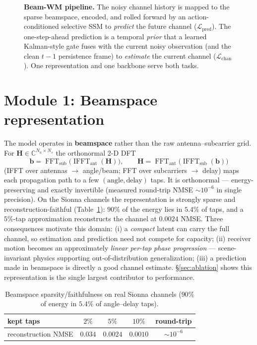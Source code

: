 \documentclass[11pt]{article}
\newcommand{\C}{\mathbb{C}}
\newcommand{\Hc}{\mathbf{H}}
\newcommand{\bs}{\mathbf{b}}
\DeclareMathOperator{\FFT}{FFT}
\DeclareMathOperator{\IFFT}{IFFT}
\begin{document}
\begin{figure}[t]
\caption{\textbf{Beam-WM pipeline.} The noisy channel history is mapped to the sparse beamspace, encoded,
and rolled forward by an action-conditioned selective SSM to \emph{predict} the future channel
($\mathcal L_{\text{pred}}$). The one-step-ahead prediction is a temporal \emph{prior} that a learned
Kalman-style gate fuses with the current noisy observation (and the clean $t{-}1$ persistence frame) to
\emph{estimate} the current channel ($\mathcal L_{\text{chan}}$). One representation and one backbone
serve both tasks.}
\label{fig:arch}
\end{figure}

\section{Module 1: Beamspace representation}\label{sec:beamspace}

The model operates in \textbf{beamspace} rather than the raw antenna--subcarrier grid. For
$\Hc\in\C^{N_a\times N_s}$ the orthonormal 2-D DFT
\begin{equation}
\bs = \FFT_{\text{sub}}\!\big(\IFFT_{\text{ant}}(\Hc)\big),\qquad
\Hc = \FFT_{\text{ant}}\!\big(\IFFT_{\text{sub}}(\bs)\big)
\end{equation}
(IFFT over antennas $\to$ angle/beam; FFT over subcarriers $\to$ delay) maps each propagation path to
a few $(\text{angle},\text{delay})$ taps. It is orthonormal --- energy-preserving and exactly
invertible (measured round-trip NMSE $\sim\!10^{-6}$ in single precision). On the Sionna channels the
representation is strongly sparse and reconstruction-faithful (Table~\ref{tab:beam}): $90\%$ of the
energy lies in $5.4\%$ of taps, and a $5\%$-tap approximation reconstructs the channel at $0.0024$
NMSE. Three consequences motivate this domain: (i) a \emph{compact} latent can carry the full channel,
so estimation and prediction need not compete for capacity; (ii) receiver motion becomes an
approximately \emph{linear per-tap phase progression} --- scene-invariant physics supporting
out-of-distribution generalization; (iii) a prediction made in beamspace is directly a good channel
estimate. \S\ref{sec:ablation} shows this representation is the single largest contributor to
performance.

\begin{table}[h]
\centering
\begin{tabular}{lcccc}
\toprule
kept taps & $2\%$ & $5\%$ & $10\%$ & round-trip \\
\midrule
reconstruction NMSE & $0.034$ & $\mathbf{0.0024}$ & $0.0010$ & $\sim\!10^{-6}$ \\
\bottomrule
\end{tabular}
\caption{Beamspace sparsity/faithfulness on real Sionna channels ($90\%$ of energy in $5.4\%$ of
angle--delay taps).}
\label{tab:beam}
\end{table}
\end{document}
